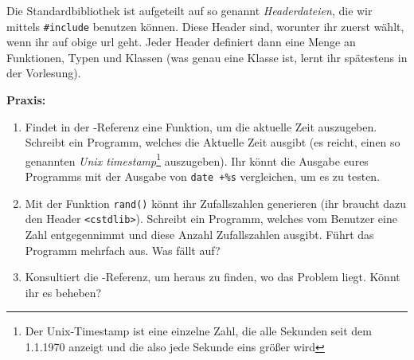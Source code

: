 Die Standardbibliothek ist aufgeteilt auf so genannt \emph{Headerdateien}, die
wir mittels \texttt{\#include} benutzen können. Diese Header sind, worunter ihr
zuerst wählt, wenn ihr auf obige url geht. Jeder Header definiert dann eine
Menge an Funktionen, Typen und Klassen (was genau eine Klasse ist, lernt ihr
spätestens in der Vorlesung).

\textbf{Praxis:}
\begin{enumerate}
	\item Findet in der \Cpp-Referenz eine Funktion, um die aktuelle Zeit
		auszugeben. Schreibt ein Programm, welches die Aktuelle Zeit ausgibt
		(es reicht, einen so genannten \emph{Unix timestamp}\footnote{Der
		Unix-Timestamp ist eine einzelne Zahl, die alle Sekunden seit dem
	1.1.1970 anzeigt und die also jede Sekunde eins größer wird} auszugeben).
	Ihr könnt die Ausgabe eures Programms mit der Ausgabe von \texttt{date
		+\%s} vergleichen, um es zu testen.
    \item Mit der Funktion \texttt{rand()} könnt ihr Zufallszahlen generieren
        (ihr braucht dazu den Header \texttt{<cstdlib>}). Schreibt ein
        Programm, welches vom Benutzer eine Zahl entgegennimmt und diese Anzahl
        Zufallszahlen ausgibt. Führt das Programm mehrfach aus. Was fällt auf?
    \item Konsultiert die \Cpp-Referenz, um heraus zu finden, wo das Problem
        liegt. Könnt ihr es beheben?
\end{enumerate}
